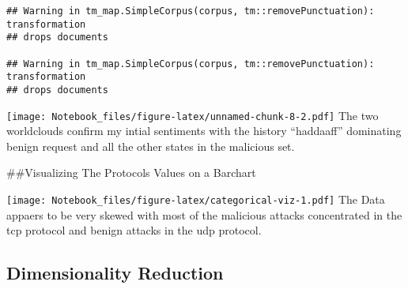 \documentclass[
]{article}
\newenvironment{Shaded}{\begin{snugshade}}{\end{snugshade}}
\newcommand{\AttributeTok}[1]{\textcolor[rgb]{0.77,0.63,0.00}{#1}}
\newcommand{\CommentTok}[1]{\textcolor[rgb]{0.56,0.35,0.01}{\textit{#1}}}
\newcommand{\FunctionTok}[1]{\textcolor[rgb]{0.00,0.00,0.00}{#1}}
\newcommand{\NormalTok}[1]{#1}
\newcommand{\OtherTok}[1]{\textcolor[rgb]{0.56,0.35,0.01}{#1}}
\newcommand{\SpecialCharTok}[1]{\textcolor[rgb]{0.00,0.00,0.00}{#1}}
\newcommand{\StringTok}[1]{\textcolor[rgb]{0.31,0.60,0.02}{#1}}
\begin{document}
\begin{verbatim}
## Warning in tm_map.SimpleCorpus(corpus, tm::removePunctuation): transformation
## drops documents

## Warning in tm_map.SimpleCorpus(corpus, tm::removePunctuation): transformation
## drops documents
\end{verbatim}

\texttt{[image: Notebook\_files/figure-latex/unnamed-chunk-8-2.pdf]} The
two worldclouds confirm my intial sentiments with the history
``haddaaff'' dominating benign request and all the other states in the
malicious set.

\#\#Visualizing The Protocols Values on a Barchart

\begin{Shaded}
\end{Shaded}

\texttt{[image: Notebook\_files/figure-latex/categorical-viz-1.pdf]} The
Data appaers to be very skewed with most of the malicious attacks
concentrated in the tcp protocol and benign attacks in the udp protocol.

\hypertarget{dimensionality-reduction}{%
\subsection{Dimensionality Reduction}\label{dimensionality-reduction}}
\end{document}
